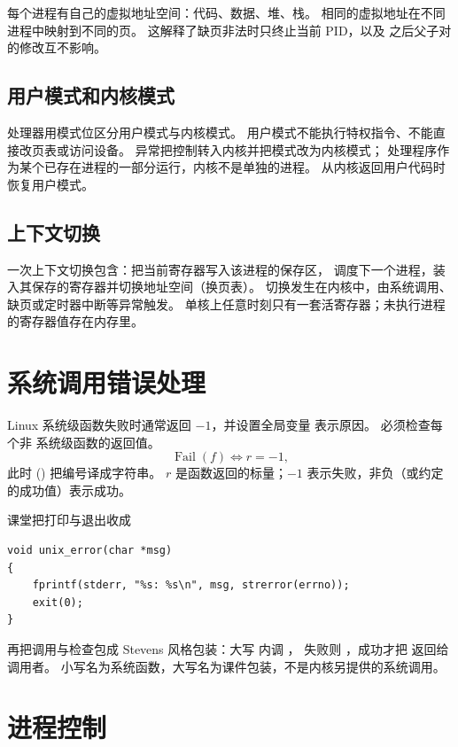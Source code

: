 每个进程有自己的虚拟地址空间：代码、数据、堆、栈。
相同的虚拟地址在不同进程中映射到不同的页。
这解释了缺页非法时只终止当前 PID，以及  之后父子对  的修改互不影响。

\subsection{用户模式和内核模式}

处理器用模式位区分用户模式与内核模式。
用户模式不能执行特权指令、不能直接改页表或访问设备。
异常把控制转入内核并把模式改为内核模式；
处理程序作为某个已存在进程的一部分运行，内核不是单独的进程。
从内核返回用户代码时恢复用户模式。

\subsection{上下文切换}


一次上下文切换包含：把当前寄存器写入该进程的保存区，
调度下一个进程，装入其保存的寄存器并切换地址空间（换页表）。
切换发生在内核中，由系统调用、缺页或定时器中断等异常触发。
单核上任意时刻只有一套活寄存器；未执行进程的寄存器值存在内存里。

\section{系统调用错误处理}

Linux 系统级函数失败时通常返回 $-1$，并设置全局变量  表示原因。
必须检查每个非  系统级函数的返回值。
\[
\operatorname{Fail}(f)\iff r=-1,
\]
此时 () 把编号译成字符串。
$r$ 是函数返回的标量；$-1$ 表示失败，非负（或约定的成功值）表示成功。

课堂把打印与退出收成
\begin{lstlisting}
void unix_error(char *msg)
{
    fprintf(stderr, "%s: %s\n", msg, strerror(errno));
    exit(0);
}
\end{lstlisting}
再把调用与检查包成 Stevens 风格包装：大写  内调 ，
失败则 ，成功才把  返回给调用者。
小写名为系统函数，大写名为课件包装，不是内核另提供的系统调用。

\section{进程控制}

